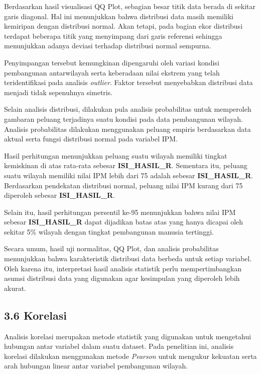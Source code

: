 \documentclass[
  12pt,
]{article}
\begin{document}
Berdasarkan hasil visualisasi QQ Plot, sebagian besar titik data berada
di sekitar garis diagonal. Hal ini menunjukkan bahwa distribusi data
masih memiliki kemiripan dengan distribusi normal. Akan tetapi, pada
bagian ekor distribusi terdapat beberapa titik yang menyimpang dari
garis referensi sehingga menunjukkan adanya deviasi terhadap distribusi
normal sempurna.

Penyimpangan tersebut kemungkinan dipengaruhi oleh variasi kondisi
pembangunan antarwilayah serta keberadaan nilai ekstrem yang telah
teridentifikasi pada analisis \textit{outlier}. Faktor tersebut
menyebabkan distribusi data menjadi tidak sepenuhnya simetris.

Selain analisis distribusi, dilakukan pula analisis probabilitas untuk
memperoleh gambaran peluang terjadinya suatu kondisi pada data
pembangunan wilayah. Analisis probabilitas dilakukan menggunakan peluang
empiris berdasarkan data aktual serta fungsi distribusi normal pada
variabel IPM.

Hasil perhitungan menunjukkan peluang suatu wilayah memiliki tingkat
kemiskinan di atas rata-rata sebesar \textbf{ISI_HASIL_R}. Sementara
itu, peluang suatu wilayah memiliki nilai IPM lebih dari 75 adalah
sebesar \textbf{ISI_HASIL_R}. Berdasarkan pendekatan distribusi normal,
peluang nilai IPM kurang dari 75 diperoleh sebesar \textbf{ISI_HASIL_R}.

Selain itu, hasil perhitungan persentil ke-95 menunjukkan bahwa nilai
IPM sebesar \textbf{ISI_HASIL_R} dapat dijadikan batas atas yang hanya
dicapai oleh sekitar 5\% wilayah dengan tingkat pembangunan manusia
tertinggi.

Secara umum, hasil uji normalitas, QQ Plot, dan analisis probabilitas
menunjukkan bahwa karakteristik distribusi data berbeda untuk setiap
variabel. Oleh karena itu, interpretasi hasil analisis statistik perlu
mempertimbangkan asumsi distribusi data yang digunakan agar kesimpulan
yang diperoleh lebih akurat.

\subsection{\texorpdfstring{\normalsize 3.6 \hspace {0,5cm}
Korelasi}{3.6  Korelasi}}\label{korelasi}

Analisis korelasi merupakan metode statistik yang digunakan untuk
mengetahui hubungan antar variabel dalam suatu dataset. Pada penelitian
ini, analisis korelasi dilakukan menggunakan metode \textit{Pearson}
untuk mengukur kekuatan serta arah hubungan linear antar variabel
pembangunan wilayah.
\end{document}
